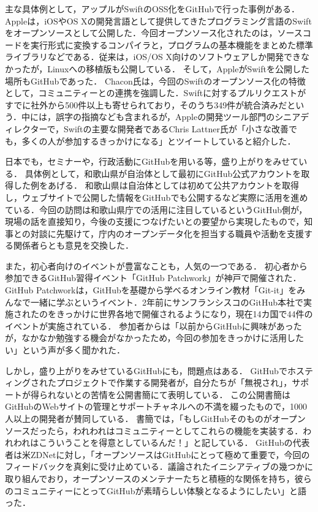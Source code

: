 主な具体例として，アップルがSwiftのOSS化をGitHubで行った事例がある．
Appleは，iOSやOS Xの開発言語として提供してきたプログラミング言語のSwiftをオープンソースとして公開した．今回オープンソース化されたのは，ソースコードを実行形式に変換するコンパイラと，プログラムの基本機能をまとめた標準ライブラリなどである．従来は，iOS/OS X向けのソフトウェアしか開発できなかったが，Linuxへの移植版も公開している．
そして，AppleがSwiftを公開した場所もGitHubであった．
Chacon氏は，今回のSwiftのオープンソース化の特徴として，コミュニティーとの連携を強調した．Swiftに対するプルリクエストがすでに社外から500件以上も寄せられており，そのうち349件が統合済みだという．中には，誤字の指摘なども含まれるが，Appleの開発ツール部門のシニアディレクターで，Swiftの主要な開発者であるChris Lattner氏が「小さな改善でも，多くの人が参加するきっかけになる」とツイートしていると紹介した\cite{kachi2015}．


日本でも，セミナーや，行政活動にGitHubを用いる等，盛り上がりをみせている．
具体例として，和歌山県が自治体として最初にGitHub公式アカウントを取得した例をあげる．
和歌山県は自治体としては初めて公共アカウントを取得し，ウェブサイトで公開した情報をGitHubでも公開するなど実際に活用を進めている．今回の訪問は和歌山県庁での活用に注目しているというGitHub側が，現場の話を直接知り，今後の支援につなげたいとの要望から実現したもので，知事との対談に先駆けて，庁内のオープンデータ化を担当する職員や活動を支援する関係者らとも意見を交換した\cite{nonoshita2015-1}．

また，初心者向けのイベントが豊富なことも，人気の一つである．
初心者から参加できるGitHub習得イベント「GitHub Patchwork」が神戸で開催された．
GitHub Patchworkは，GitHubを基礎から学べるオンライン教材「Git-it」をみんなで一緒に学ぶというイベント．2年前にサンフランシスコのGitHub本社で実施されたのをきっかけに世界各地で開催されるようになり，現在14カ国で44件のイベントが実施されている．
参加者からは「以前からGitHubに興味があったが，なかなか勉強する機会がなかったため，今回の参加をきっかけに活用したい」という声が多く聞かれた\cite{nonoshita2015-2}．

しかし，盛り上がりをみせているGitHubにも，問題点はある．
GitHubでホスティングされたプロジェクトで作業する開発者が，自分たちが「無視され」，サポートが得られないとの苦情を公開書簡にて表明している．
この公開書簡はGitHubのWebサイトの管理とサポートチャネルへの不満を綴ったもので，1000人以上の開発者が賛同している．
書簡では，「もしGitHubそのものがオープンソースだったら，われわれはコミュニティーとしてこれらの機能を実装する．われわれはこういうことを得意としているんだ！」と記している．
GitHubの代表者は米ZDNetに対し，「オープンソースはGitHubにとって極めて重要で，今回のフィードバックを真剣に受け止めている．議論されたイニシアティブの幾つかに取り組んでおり，オープンソースのメンテナーたちと積極的な関係を持ち，彼らのコミュニティーにとってGitHubが素晴らしい体験となるようにしたい」と語った\cite{Charlie2016}．


